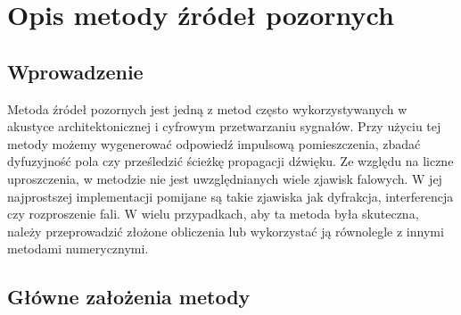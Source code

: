 \chapter{Opis metody źródeł pozornych}\label{cha:ims}


\section{Wprowadzenie}\label{sec:wprowadzenie}

Metoda źródeł pozornych jest jedną z metod często wykorzystywanych w akustyce architektonicznej i cyfrowym przetwarzaniu sygnałów. Przy użyciu tej metody możemy wygenerować odpowiedź impulsową pomieszczenia, zbadać dyfuzyjność pola  czy prześledzić ścieżkę propagacji dźwięku. Ze względu na liczne uproszczenia, w metodzie nie jest uwzględnianych wiele zjawisk falowych. W jej najprostszej implementacji pomijane są takie zjawiska jak dyfrakcja, interferencja czy rozproszenie fali. W wielu przypadkach, aby ta metoda była skuteczna, należy przeprowadzić złożone obliczenia lub wykorzystać ją równolegle z innymi metodami numerycznymi.



\section{Główne założenia metody}\label{sec:gzm}

